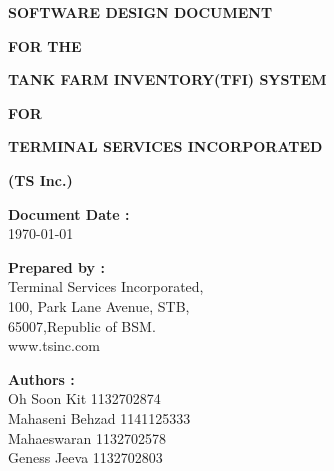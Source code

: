 

	
	\thispagestyle{empty}
	\begin{titlepage}
		\null\vfill
		
		\begin{center}
			
			{\Large \textbf{SOFTWARE DESIGN DOCUMENT}}
			\vspace{10mm}
			
			{\Large \textbf{FOR THE}}
			\vspace{10mm}
			
			{\Large \textbf{TANK FARM INVENTORY(TFI) SYSTEM}}
			\vspace{10mm}
			
			{\Large \textbf{FOR}}
			\vspace{10mm}
			
			{\Large \textbf{TERMINAL SERVICES INCORPORATED}}
			\vspace{10mm}
			
			{\Large \textbf{(TS Inc.)}}
			\vspace{10mm}
			
			
		\end{center}
		
		
		\vfill
		\vfill
		
		\begin{flushleft}
			
			\textbf{Document Date :}\\
			\today
			\vspace{7mm}
			
			\textbf{Prepared by :}\\
			Terminal Services Incorporated,\\
			100, Park Lane Avenue, STB,\\
			65007,Republic of BSM.\\
			www.tsinc.com
			\vspace{7mm}
			
			\textbf{Authors :}\\
			Oh Soon Kit 1132702874 \\
			Mahaseni Behzad 1141125333 \\
			Mahaeswaran 1132702578 \\
			Geness Jeeva 1132702803 \\
			
			
			
		\end{flushleft}
		\hfill
	\end{titlepage}